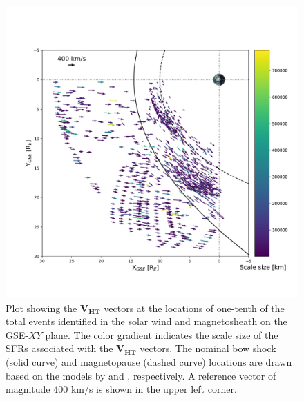 \begin{figure}
    \centering
    \includegraphics[width=\textwidth]{Figures/Orbits/VHT_xy_scalesize.png}
    \caption[Orbit plot of flow vectors associated with the SFRs, in relation to their scale size]{Plot showing the $\mathbf{V_{HT}}$ vectors at the locations of one-tenth of the total events identified in the solar wind and magnetosheath on the GSE-$XY$ plane. The color gradient indicates the scale size of the SFRs associated with the $\mathbf{V_{HT}}$ vectors. The nominal bow shock (solid curve) and magnetopause (dashed curve) locations are drawn based on the models by \citet{Shue:1997} and \citet{SlavinHolzer:1984}, respectively. A reference vector of magnitude 400 km/s is shown in the upper left corner.}
    \label{fig:VHT-scalesize}
\end{figure}